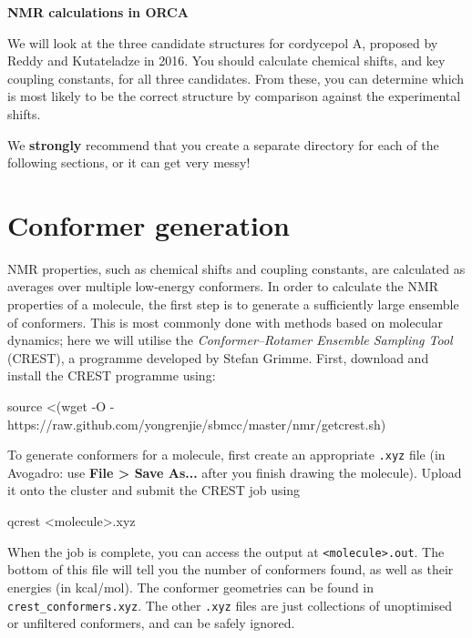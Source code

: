 \documentclass[10pt]{article}
\begin{document}

\textbf{\LARGE NMR calculations in ORCA}

\vspace{0.5cm}

We will look at the three candidate structures for cordycepol A, proposed by Reddy and Kutateladze in 2016.\autocite{Reddy2016} You should calculate chemical shifts, and key coupling constants, for all three candidates. From these, you can determine which is most likely to be the correct structure by comparison against the experimental shifts.

\begin{warning}
We \textbf{strongly} recommend that you create a separate directory for each of the following sections, or it can get very messy!
\end{warning}

\section{Conformer generation}

NMR properties, such as chemical shifts and coupling constants, are calculated as averages over multiple low-energy conformers. In order to calculate the NMR properties of a molecule, the first step is to generate a sufficiently large ensemble of conformers. This is most commonly done with methods based on molecular dynamics; here we will utilise the \textit{Conformer--Rotamer Ensemble Sampling Tool} (CREST), a programme developed by Stefan Grimme.\autocite{Bannwarth2019, Grimme2019} First, download and install the CREST programme using:

\begin{cmdline}
source <(wget -O - https://raw.github.com/yongrenjie/sbmcc/master/nmr/getcrest.sh)
\end{cmdline}

To generate conformers for a molecule, first create an appropriate \texttt{.xyz} file (in Avogadro: use \textbf{File > Save As...} after you finish drawing the molecule). Upload it onto the cluster and submit the CREST job using

\begin{cmdline}
qcrest <molecule>.xyz
\end{cmdline}

When the job is complete, you can access the output at \texttt{<molecule>.out}. The bottom of this file will tell you the number of conformers found, as well as their energies (in kcal/mol). The conformer geometries can be found in \texttt{crest\_conformers.xyz}. The other \texttt{.xyz} files are just collections of unoptimised or unfiltered conformers, and can be safely ignored.
\end{document}
